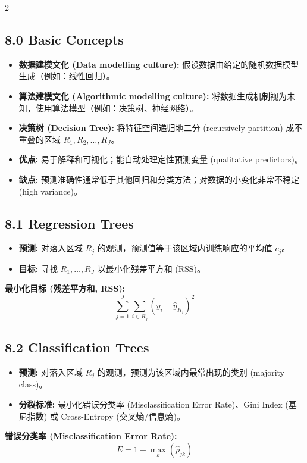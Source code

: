 \documentclass[6pt,a4paper]{ctexart}
\begin{document}
\begin{multicols}{2}
\subsection*{8.0 Basic Concepts}
\begin{itemize}
    \item \textbf{数据建模文化 (Data modelling culture):} 假设数据由给定的随机数据模型生成（例如：线性回归）。
    \item \textbf{算法建模文化 (Algorithmic modelling culture):} 将数据生成机制视为未知，使用算法模型（例如：决策树、神经网络）。
    \item \textbf{决策树 (Decision Tree):} 将特征空间递归地二分 (recursively partition) 成不重叠的区域 $R_1, R_2, \ldots, R_J$。
    \item \textbf{优点:} 易于解释和可视化；能自动处理定性预测变量 (qualitative predictors)。
    \item \textbf{缺点:} 预测准确性通常低于其他回归和分类方法；对数据的小变化非常不稳定 (high variance)。
\end{itemize}

\subsection*{8.1 Regression Trees}
\begin{itemize}
    \item \textbf{预测:} 对落入区域 $R_j$ 的观测，预测值等于该区域内训练响应的平均值 $c_j$。
    \item \textbf{目标:} 寻找 $R_1, \ldots, R_J$ 以最小化残差平方和 (RSS)。
\end{itemize}

\textbf{最小化目标 (残差平方和, RSS):}
$$ \sum_{j=1}^{J} \sum_{i \in R_{j}} (y_{i} - \hat{y}_{R_{j}})^{2} $$

\subsection*{8.2 Classification Trees}
\begin{itemize}
    \item \textbf{预测:} 对落入区域 $R_j$ 的观测，预测为该区域内最常出现的类别 (majority class)。
    \item \textbf{分裂标准:} 最小化错误分类率 (Misclassification Error Rate)、Gini Index (基尼指数) 或 Cross-Entropy (交叉熵/信息熵)。
\end{itemize}

\textbf{错误分类率 (Misclassification Error Rate):}
$$ E = 1 - \max_{k}(\hat{p}_{jk}) $$


\end{multicols}
\end{document}
